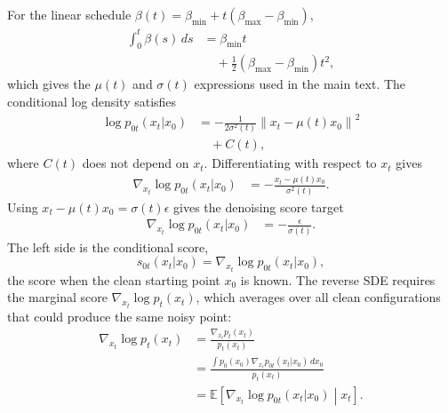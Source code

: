 \documentclass[reprint,amsmath,amssymb,aps,pra,10pt]{revtex4-2}
\begin{document}
For the linear schedule $\beta(t)=\beta_{\min}+t(\beta_{\max}-\beta_{\min})$,
\begin{equation}
    \begin{aligned}
        \int_0^t\beta(s)\,ds
        &=
        \beta_{\min}t
        \\
        &\quad
        +
        \frac{1}{2}
        \left(
            \beta_{\max}-\beta_{\min}
        \right)t^2,
    \end{aligned}
\end{equation}
which gives the $\mu(t)$ and $\sigma(t)$ expressions used in the main text.
The conditional log density satisfies
\begin{equation}
    \begin{aligned}
        \log p_{0t}(x_t|x_0)
        &=
        -\frac{1}{2\sigma^2(t)}
        \left\|
            x_t-\mu(t)x_0
        \right\|^2
        \\
        &\quad
        +
        C(t),
    \end{aligned}
\end{equation}
where $C(t)$ does not depend on $x_t$.
Differentiating with respect to $x_t$ gives
\begin{equation}
    \begin{aligned}
        \nabla_{x_t}\log p_{0t}(x_t|x_0)
        &=
        -
        \frac{x_t-\mu(t)x_0}{\sigma^2(t)}.
    \end{aligned}
\end{equation}
Using $x_t-\mu(t)x_0=\sigma(t)\epsilon$ gives the denoising score target
\begin{equation}
    \begin{aligned}
        \nabla_{x_t}\log p_{0t}(x_t|x_0)
        &=
        -
        \frac{\epsilon}
             {\sigma(t)}.
    \end{aligned}
\end{equation}
The left side is the conditional score,
\begin{equation}
    s_{0t}(x_t|x_0)
    =
    \nabla_{x_t}\log p_{0t}(x_t|x_0),
\end{equation}
the score when the clean starting point $x_0$ is known.
The reverse SDE requires the marginal score $\nabla_{x_t}\log p_t(x_t)$, which averages over all clean configurations that could produce the same noisy point:
\begin{equation}
    \begin{aligned}
        \nabla_{x_t}\log p_t(x_t)
        &=
        \frac{\nabla_{x_t}p_t(x_t)}
             {p_t(x_t)}
        \\
        &=
        \frac{
            \int
            p_0(x_0)
            \nabla_{x_t}p_{0t}(x_t|x_0)
            \,dx_0
        }
        {p_t(x_t)}
        \\
        &=
        \mathbb{E}
        \left[
            \nabla_{x_t}\log p_{0t}(x_t|x_0)
            \middle|x_t
        \right].
    \end{aligned}
\end{equation}
\end{document}
